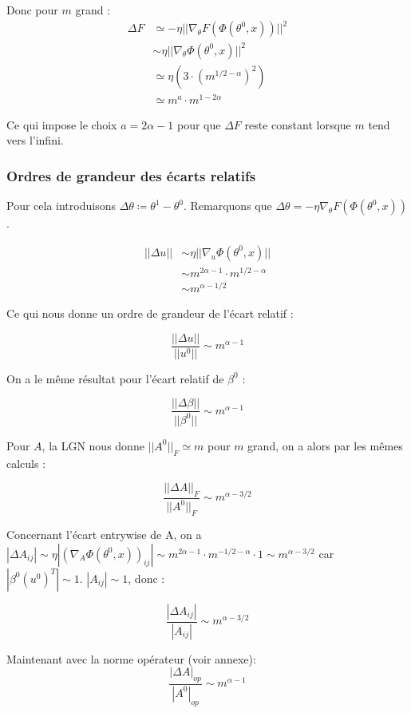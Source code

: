 \documentclass[a4paper, 11pt, french]{article}
\theoremstyle{definition}
\begin{document}
	 Donc pour $m$ grand :
	 \begin{align*}
	 	\Delta F &\simeq -\eta || \nabla_{\theta} F(\Phi(\theta^0, x)) ||^2 \\
	 	&\sim \eta || \nabla_{\theta} \Phi(\theta^0, x) ||^2 \\
	 	&\simeq \eta (3 \cdot (m^{1/2 - \alpha})^2) \\
	 	&\simeq m^a \cdot m^{1 - 2\alpha}
	 \end{align*}	
	
	Ce qui impose le choix $a = 2\alpha - 1$ pour que $\Delta F$ reste constant lorsque $m$ tend vers l'infini.\\
	
	\subsubsection{Ordres de grandeur des écarts relatifs}

	Pour cela introduisons $\Delta \theta \coloneqq \theta^1 - \theta^0$. Remarquons que $	\Delta \theta = - \eta \nabla_{\theta} F(\Phi(\theta^0, x))$.
	
	\begin{align}
		||\Delta u|| &\sim \eta || \nabla_u \Phi(\theta^0, x) || \\
		&\sim m^{2\alpha - 1} \cdot m^{1/2 - \alpha} \\
		&\sim m^{\alpha - 1/2}
	\end{align}

	Ce qui nous donne un ordre de grandeur de l'écart relatif :
	
	\[\frac{||\Delta u||}{||u^0||} \sim m^{\alpha - 1}\]
	
	On a le même résultat pour l'écart relatif de $\beta^0$ :
	
	\[\frac{||\Delta \beta||}{||\beta^0||} \sim m^{\alpha - 1}\]
	
	Pour $A$, la LGN nous donne $||A^0||_F \simeq m$ pour $m$ grand, on a alors par les mêmes calculs :
	
	\[\frac{||\Delta A||_F}{||A^0||_F} \sim m^{\alpha - 3/2}\]
	
	Concernant l'écart entrywise de A, on a $|\Delta A_{ij}| \sim \eta | (\nabla_A \Phi(\theta^0, x))_{ij} | \sim m^{2\alpha - 1} \cdot m^{-1/2 - \alpha} \cdot 1 \sim m^{\alpha - 3/2}$ car $|\beta^0 (u^0)^T| \sim 1$. $|A_{ij}| \sim 1$, donc :

	\[\frac{|\Delta A_{ij}|}{|A_{ij}|} \sim m^{\alpha - 3/2}\]
	
	Maintenant avec la norme opérateur (voir annexe): 
	\[\frac{|\Delta A|_{op}}{|A^0|_{op}} \sim m^{\alpha - 1}\]
	
\end{document}
